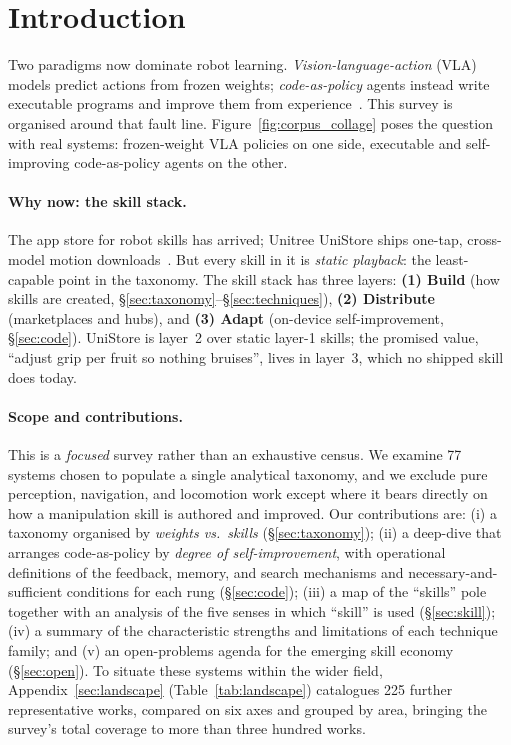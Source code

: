 \section{Introduction}
\label{sec:intro}

Two paradigms now dominate robot learning. \emph{Vision-language-action} (VLA)
models predict actions from frozen weights; \emph{code-as-policy} agents instead
write executable programs and improve them from experience~\citep{codeaspolicies,aspire}.
This survey is organised around that fault line. Figure~\ref{fig:corpus_collage} poses the question
with real systems: frozen-weight VLA policies on one side, executable and self-improving
code-as-policy agents on the other.



\paragraph{Why now: the skill stack.}
The app store for robot skills has arrived; Unitree UniStore ships one-tap,
cross-model motion downloads~\citep{unistore2026}. But every skill in it is
\emph{static playback}: the least-capable point in the taxonomy. The skill stack has
three layers: \textbf{(1) Build} (how skills are created, \S\ref{sec:taxonomy}--\S\ref{sec:techniques}),
\textbf{(2) Distribute} (marketplaces and hubs), and \textbf{(3) Adapt} (on-device
self-improvement, \S\ref{sec:code}). UniStore is layer~2 over static layer-1 skills;
the promised value, ``adjust grip per fruit so nothing bruises'', lives in layer~3,
which no shipped skill does today.

\paragraph{Scope and contributions.}
This is a \emph{focused} survey rather than an exhaustive census. We examine 77 systems chosen
to populate a single analytical taxonomy, and we exclude pure perception, navigation, and
locomotion work except where it bears directly on how a manipulation skill is authored and
improved. Our contributions are: (i) a taxonomy organised by \emph{weights vs.\ skills}
(\S\ref{sec:taxonomy}); (ii) a deep-dive that arranges code-as-policy by \emph{degree of
self-improvement}, with operational definitions of the feedback, memory, and search mechanisms
and necessary-and-sufficient conditions for each rung (\S\ref{sec:code}); (iii) a map of the
``skills'' pole together with an analysis of the five senses in which ``skill'' is used
(\S\ref{sec:skill}); (iv) a summary of the characteristic strengths and limitations of each
technique family; and (v) an open-problems agenda for the emerging skill economy
(\S\ref{sec:open}). To situate these systems within the wider field,
Appendix~\ref{sec:landscape} (Table~\ref{tab:landscape}) catalogues 225 further representative
works, compared on six axes and grouped by area, bringing the survey's total coverage to more than
three hundred works.

